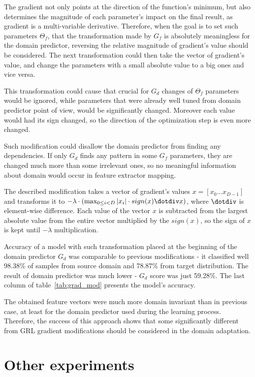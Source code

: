 \documentclass[shortabstract, inz, english]{iithesis}
\begin{document}
The gradient not only points at the direction of the function's minimum, but also determines the magnitude of each parameter's impact on the final result, as gradient is a multi-variable derivative. Therefore, when the goal is to set such parameters $\Theta_{f}$, that the transformation made by $G_{f}$ is absolutely meaningless for the domain predictor, reversing the relative magnitude of gradient's value should be considered. The next transformation could then take the vector of gradient's value, and change the parameters with a small absolute value to a big ones and vice versa. 
\par
This transformation could cause that crucial for $G_{d}$ changes of $\Theta_{f}$ parameters would be ignored, while parameters that were already well tuned from domain predictor point of view, would be significantly changed. Moreover each value would had its sign changed, so the direction of the optimization step is even more changed.
\par
Such modification could disallow the domain predictor from finding any dependencies. If only $G_{d}$ finds any pattern in some $G_{f}$ parameters, they are changed much more than some irrelevant ones, so no meaningful information about domain would occur in feature extractor mapping. 
\par
The described modification takes a vector of gradient's values $x = [x_{0}...x_{D-1}]$ and transforms it to $-\lambda \cdot (\max_{0 \leq i < D} |x_{i}| \cdot sign(x) \dotdiv x)$, where $\dotdiv$ is element-wise difference. Each value of the vector $x$ is subtracted from the largest absolute value from the entire vector multiplied by the $sign(x)$, so the sign of $x$ is kept until $-\lambda$ multiplication.
\par
Accuracy of a model with such transformation placed at the beginning of the domain predictor $G_{d}$ was comparable to previous modifications - it classified well 98.38\% of samples from source domain and 78.87\% from target distribution. The result of domain predictor was much lower - $G_{d}$ score was just 59.28\%. The last column of table~\ref{tab:grad_mod} presents the model's accuracy.
\par
The obtained feature vectors were much more domain invariant than in previous case, at least for the domain predictor used during the learning process. Therefore, the success of this approach shows that some significantly different from GRL gradient modifications should be considered in the domain adaptation.

\section{Other experiments}
\end{document}
